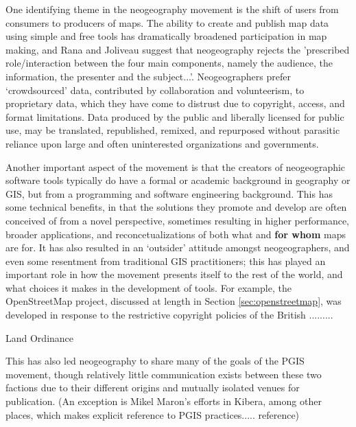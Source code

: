 \documentclass[11pt]{report}
\begin{document}
One identifying theme in the neogeography movement is the shift of users from consumers to producers of maps. \cite{oconnor2008maps} The ability to create and publish map data using simple and free tools has dramatically broadened participation in map making, and Rana and Joliveau suggest that neogeography rejects the 'prescribed role/interaction between the four main components, namely the audience, the information, the presenter and the subject...'. \cite{rana2009neogeography} Neogeographers prefer `crowdsourced' data, contributed by collaboration and volunteerism, to proprietary data, which they have come to distrust due to copyright, access, and format limitations. Data produced by the public and liberally licensed for public use, may be translated, republished, remixed, and repurposed without parasitic reliance upon large and often uninterested organizations and governments. 

Another important aspect of the movement is that the creators of neogeographic software tools typically do have a formal or academic background in geography or GIS, but from a programming and software engineering background. This has some technical benefits, in that the solutions they promote and develop are often conceived of from a novel perspective, sometimes resulting in higher performance, broader applications, and reconcetualizations of both what and \textbf{for whom} maps are for. It has also resulted in an `outsider' attitude amongst neogeographers, and even some resentment from traditional GIS practitioners; this has played an important role in how the movement presents itself to the rest of the world, and what choices it makes in the development of tools. For example, the OpenStreetMap project, discussed at length in Section \ref{sec:openstreetmap}, was developed in response to the restrictive copyright policies of the British ......... 

Land Ordinance

This has also led neogeography to share many of the goals of the PGIS movement, though relatively little communication exists between these two factions due to their different origins and mutually isolated venues for publication. (An exception is Mikel Maron's efforts in Kibera, among other places, which makes explicit reference to PGIS practices..... reference)


\end{document}

